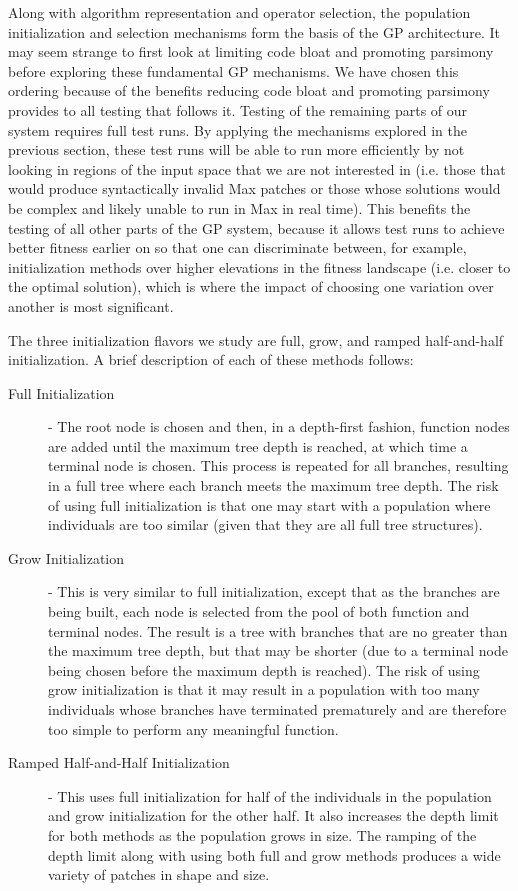 \documentclass[12pt]{report} 	%
\numberwithin{figure}{chapter}
\numberwithin{table}{chapter}
\numberwithin{equation}{chapter}
\begin{document}
\begin{flushleft}
Along with algorithm representation and operator selection, the population initialization and selection mechanisms form the basis of the GP architecture. It may seem strange to first look at limiting code bloat and promoting parsimony before exploring these fundamental GP mechanisms. We have chosen this ordering because of the benefits reducing code bloat and promoting parsimony provides to all testing that follows it. Testing of the remaining parts of our system requires full test runs. By applying the mechanisms explored in the previous section, these test runs will be able to run more efficiently by not looking in regions of the input space that we are not interested in (i.e. those that would produce syntactically invalid Max patches or those whose solutions would be complex and likely unable to run in Max in real time). This benefits the testing of all other parts of the GP system, because it allows test runs to achieve better fitness earlier on so that one can discriminate between, for example, initialization methods over higher elevations in the fitness landscape (i.e. closer to the optimal solution), which is where the impact of choosing one variation over another is most significant.

The three initialization flavors we study are full, grow, and ramped half-and-half initialization. A brief description of each of these methods follows:
\begin{description}
\item [Full Initialization] - The root node is chosen and then, in a depth-first fashion, function nodes are added until the maximum tree depth is reached, at which time a terminal node is chosen. This process is repeated for all branches, resulting in a full tree where each branch meets the maximum tree depth. The risk of using full initialization is that one may start with a population where individuals are too similar (given that they are all full tree structures).
\item [Grow Initialization] - This is very similar to full initialization, except that as the branches are being built, each node is selected from the pool of both function and terminal nodes. The result is a tree with branches that are no greater than the maximum tree depth, but that may be shorter (due to a terminal node being chosen before the maximum depth is reached). The risk of using grow initialization is that it may result in a population with too many individuals whose branches have terminated prematurely and are therefore too simple to perform any meaningful function.
\item [Ramped Half-and-Half Initialization] - This uses full initialization for half of the individuals in the population and grow initialization for the other half. It also increases the depth limit for both methods as the population grows in size. The ramping of the depth limit along with using both full and grow methods produces a wide variety of patches in shape and size.
\end{description}


\end{flushleft}
\end{document}
